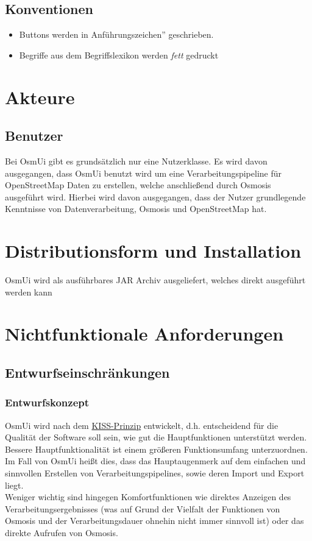 \documentclass[a4paper,12pt]{scrartcl}
\begin{document}
\subsection{Konventionen}
\begin{itemize}
\item Buttons werden in \glqq Anführungszeichen'' geschrieben.
\item Begriffe aus dem Begriffslexikon werden \textit{fett} gedruckt
\end{itemize}

\section{Akteure}
\subsection{Benutzer}
Bei OsmUi gibt es grundsätzlich nur eine Nutzerklasse. Es wird davon ausgegangen, dass OsmUi benutzt wird um eine Verarbeitungspipeline für OpenStreetMap Daten
zu erstellen, welche anschließend durch Osmosis ausgeführt wird. Hierbei wird davon ausgegangen, dass der Nutzer grundlegende Kenntnisse 
von Datenverarbeitung, Osmosis und OpenStreetMap hat.

\section{Distributionsform und Installation}
OsmUi wird als ausführbares JAR Archiv ausgeliefert, welches direkt ausgeführt werden kann

\section{Nichtfunktionale Anforderungen}
\subsection{Entwurfseinschränkungen}
\subsubsection{Entwurfskonzept}
OsmUi wird nach dem \href{http://de.wikipedia.org/wiki/KISS-Prinzip}{KISS-Prinzip} entwickelt, d.h. entscheidend für die Qualität der Software soll sein, wie gut die Hauptfunktionen unterstützt werden. Bessere Hauptfunktionalität ist einem größeren Funktionsumfang unterzuordnen.\\
Im Fall von OsmUi heißt dies, dass das Hauptaugenmerk auf dem einfachen und sinnvollen Erstellen von Verarbeitungspipelines, sowie deren Import und Export liegt.\\
Weniger wichtig sind hingegen Komfortfunktionen wie direktes Anzeigen des Verarbeitungsergebnisses (was auf Grund der Vielfalt der Funktionen von Osmosis
und der Verarbeitungsdauer ohnehin nicht immer sinnvoll ist) oder das direkte Aufrufen von Osmosis.
\end{document}

